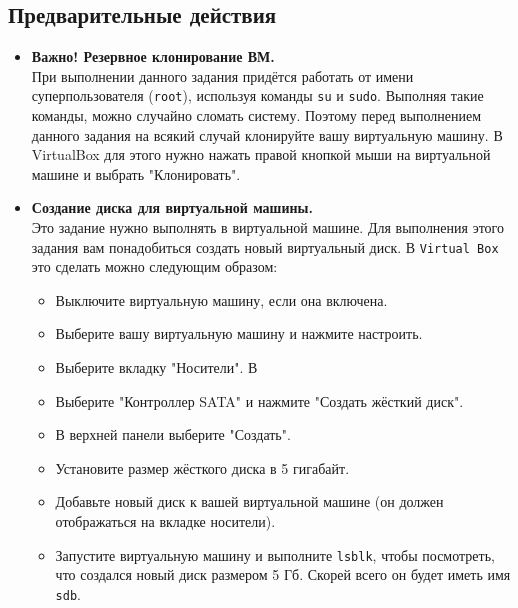 \documentclass{article}
\begin{document}
\subsection*{Предварительные действия}
\begin{itemize}
\item \textbf{Важно! Резервное клонирование ВМ.} \\
При выполнении данного задания придётся работать от имени суперпользователя (\texttt{root}), используя команды \texttt{su} и \texttt{sudo}. Выполняя такие команды, можно случайно сломать систему. Поэтому перед выполнением данного задания на всякий случай клонируйте вашу виртуальную машину. В VirtualBox для этого нужно нажать правой кнопкой мыши на виртуальной машине и выбрать "Клонировать".

\item \textbf{Создание диска для виртуальной машины.} \\
Это задание нужно выполнять в виртуальной машине. Для выполнения этого задания вам понадобиться создать новый виртуальный диск. В \texttt{Virtual Box} это сделать можно следующим образом:
\begin{itemize}
\item Выключите виртуальную машину, если она включена.
\item Выберите вашу виртуальную машину и нажмите настроить.
\item Выберите вкладку "Носители". В
\item Выберите "Контроллер SATA"{} и нажмите "Создать жёсткий диск".
\item В верхней панели выберите "Создать".
\item Установите размер жёсткого диска в 5 гигабайт. 
\item Добавьте новый диск к вашей виртуальной машине (он должен отображаться на вкладке носители). 
\item Запустите виртуальную машину и выполните \texttt{lsblk}, чтобы посмотреть, что создался новый диск размером 5 Гб. Скорей всего он будет иметь имя \texttt{sdb}.
\end{itemize}
\end{itemize}



\newpage
\end{document}
